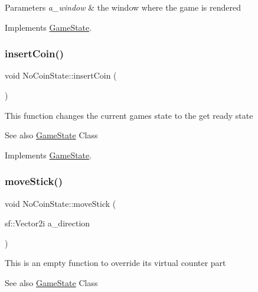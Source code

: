 \begin{DoxyParams}{Parameters}
{\em a\+\_\+window} & the window where the game is rendered \\
\hline
\end{DoxyParams}


Implements \hyperlink{class_game_state_a5ffd5ce9acb7499ddef613e8836d1ef8}{Game\+State}.

\mbox{\label{class_no_coin_state_a417209eadad2f71284cf09d369bc389e}} 
\subsubsection{\texorpdfstring{insert\+Coin()}{insertCoin()}}
{\footnotesize\ttfamily void No\+Coin\+State\+::insert\+Coin (\begin{DoxyParamCaption}{ }\end{DoxyParamCaption})\hspace{0.3cm}{\ttfamily [virtual]}}

This function changes the current game\textquotesingle{}s state to the get ready state \begin{DoxySeeAlso}{See also}
\hyperlink{class_game_state}{Game\+State} Class 
\end{DoxySeeAlso}


Implements \hyperlink{class_game_state_a4cd6f5b4ad23fc08dca287df26d94b94}{Game\+State}.

\mbox{\label{class_no_coin_state_a9fe8f36082705e6f5833244890093adc}} 
\subsubsection{\texorpdfstring{move\+Stick()}{moveStick()}}
{\footnotesize\ttfamily void No\+Coin\+State\+::move\+Stick (\begin{DoxyParamCaption}\item[{sf\+::\+Vector2i}]{a\+\_\+direction }\end{DoxyParamCaption})\hspace{0.3cm}{\ttfamily [virtual]}}

This is an empty function to override it\textquotesingle{}s virtual counter part \begin{DoxySeeAlso}{See also}
\hyperlink{class_game_state}{Game\+State} Class 
\end{DoxySeeAlso}

